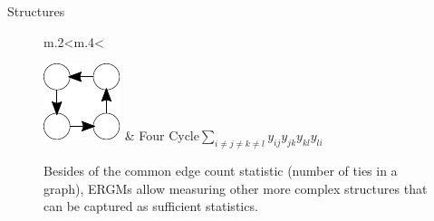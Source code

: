 \documentclass[10pt,ignorenonframetext,handout,aspectratio=169,]{beamer}
\begin{document}
\begin{frame}{Structures}
\begin{figure}
\begin{tabular}{m{.2\linewidth}<\centering m{.4\linewidth}<\raggedright}
\includegraphics[width=.45\linewidth]{terms/fourcycle.pdf} & Four Cycle\linebreak[4]$\sum_{i\neq j \neq k \neq l}y_{ij}y_{jk}y_{kl}y_{li}$  \\
\bottomrule
\end{tabular}
\caption{\label{fig:ergm-structs}Besides of the common edge count statistic (number of ties in a graph), ERGMs allow measuring other more complex structures that can be captured as sufficient statistics. }
\end{figure}

\end{frame}
\end{document}
